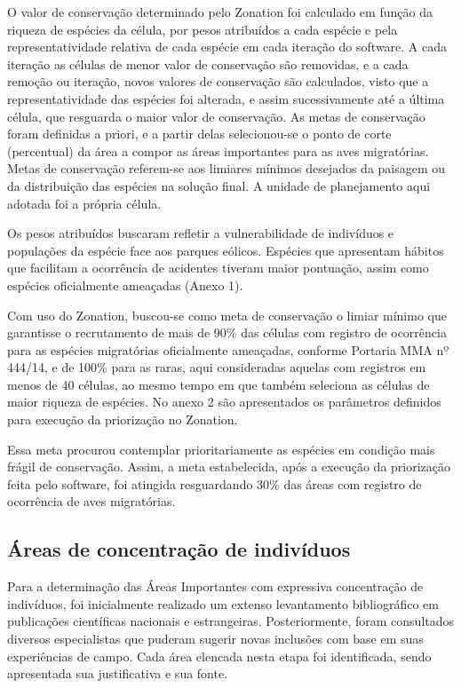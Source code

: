 \documentclass[
  oneside]{scrbook}
\begin{document}
O valor de conservação determinado pelo Zonation foi calculado em função da riqueza de espécies da célula, por pesos atribuídos a cada espécie e pela representatividade relativa de cada espécie em cada iteração do software. A cada iteração as células de menor valor de conservação são removidas, e a cada remoção ou iteração, novos valores de conservação são calculados, visto que a representatividade das espécies foi alterada, e assim sucessivamente até a última célula, que resguarda o maior valor de conservação. As metas de conservação foram definidas a priori, e a partir delas selecionou-se o ponto de corte (percentual) da área a compor as áreas importantes para as aves migratórias. Metas de conservação referem-se aos limiares mínimos desejados da paisagem ou da distribuição das espécies na solução final. A unidade de planejamento aqui adotada foi a própria célula.

Os pesos atribuídos buscaram refletir a vulnerabilidade de indivíduos e populações da espécie face aos parques eólicos. Espécies que apresentam hábitos que facilitam a ocorrência de acidentes tiveram maior pontuação, assim como espécies oficialmente ameaçadas (Anexo 1).

Com uso do Zonation, buscou-se como meta de conservação o limiar mínimo que garantisse o recrutamento de mais de 90\% das células com registro de ocorrência para as espécies migratórias oficialmente ameaçadas, conforme Portaria MMA nº 444/14, e de 100\% para as raras, aqui consideradas aquelas com registros em menos de 40 células, ao mesmo tempo em que também seleciona as células de maior riqueza de espécies. No anexo 2 são apresentados os parâmetros definidos para execução da priorização no Zonation.

Essa meta procurou contemplar prioritariamente as espécies em condição mais frágil de conservação. Assim, a meta estabelecida, após a execução da priorização feita pelo software, foi atingida resguardando 30\% das áreas com registro de ocorrência de aves migratórias.

\hypertarget{areas-concentracao}{%
\subsection{Áreas de concentração de indivíduos}\label{areas-concentracao}}

Para a determinação das Áreas Importantes com expressiva concentração de indivíduos, foi inicialmente realizado um extenso levantamento bibliográfico em publicações científicas nacionais e estrangeiras. Posteriormente, foram consultados diversos especialistas que puderam sugerir novas inclusões com base em suas experiências de campo. Cada área elencada nesta etapa foi identificada, sendo apresentada sua justificativa e sua fonte.
\end{document}
